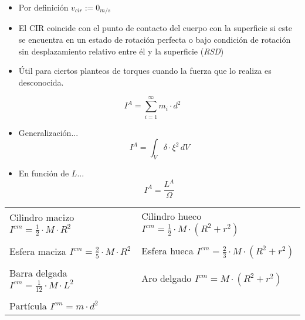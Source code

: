     \begin{itemize}
        \item Por definición $v_{cir} := 0_{m/s}$
        \item El CIR coincide con el punto de contacto del cuerpo con la superficie si este se encuentra en un estado de rotación perfecta o bajo condición de rotación sin desplazamiento relativo entre él y la superficie (\textit{RSD})
        \item Útil para ciertos planteos de torques cuando la fuerza que lo realiza es desconocida.
    \end{itemize}
\newpage

 \begin{equation}
        I^{A} = \sum_{i=1}^{\infty} m_i \cdot d^2
 \end{equation}
 \begin{itemize}
    \item Generalización...
    \begin{equation*}
        I^{A} = \int_V \delta \cdot \xi^2 \,dV
    \end{equation*}
    \item En función de $L$...
    \begin{equation}
        I^{A} =\frac{L^A}{\Omega}
    \end{equation}
 \end{itemize}

\begin{center}
\begin{tabular}{>{\centering\arraybackslash}m{1.25in} >{\centering\arraybackslash}m{1.25in}}
    Cilindro macizo $I^{cm} = \frac{1}{2} \cdot M \cdot   R ^ 2       $&
    Cilindro hueco  $I^{cm} = \frac{1}{2} \cdot M \cdot  (R ^ 2 + r^2)$
    \\\\
    Esfera maciza $I^{cm} = \frac{2}{5} \cdot M \cdot R ^ 2$&
    Esfera hueca  $I^{cm} = \frac{2}{3} \cdot M \cdot  (R^ 2 + r^2)$
    \\\\
    Barra delgada $I^{cm} = \frac{1}{12} \cdot M \cdot L ^ 2$&
    Aro delgado  $I^{cm} = M \cdot  (R^ 2 + r^2)$
    \\\\
    Partícula $I^{cm} = m \cdot d ^ 2$&
\end{tabular}
\end{center}
 
